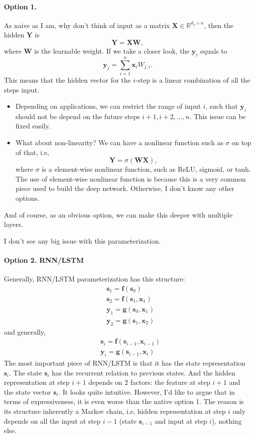 \documentclass[11pt,a4paper]{article}
\begin{document}
\paragraph{Option 1.} 
As naive as I am, why don't think of input as a matrix $\bm{X} \in \mathbb{R}^{d_1 \times n}$, then the hidden $\bm{Y}$ is
\[
\bm{Y} = \bm{X} \bm{W},
\] 
where $\bm{W}$ is the learnable weight. If we take a closer look, the $\bm{y}_i$ equals to
\[
\bm{y}_j = \sum^{n}_{i=1} \bm{x}_i W_{j, i}.
\] 
This means that the hidden vector for the $i$-step is a linear combination of all the steps input.
\begin{itemize}
    \item Depending on applications, we can restrict the range of input $i$, such that $\bm{y}_i$ should not be depend on the future steps $i+1, i+2, \ldots , n$. This issue can be fixed easily.
    \item What about non-linearity? We can have a nonlinear function such as $\sigma$ on top of that, i.e, 
        \[
        \bm{Y} = \sigma(\bm{W}\bm{X}),
        \] 
        where $\sigma$ is a element-wise nonlinear function, such as ReLU, sigmoid, or tanh. The use of element-wise nonlinear function is because this is a very common piece used to build the deep network. Otherwise, I don't know any other options.
\end{itemize}
And of course, as an obvious option, we can make this deeper with multiple layers.

I don't see any big issue with this parameterization.

\paragraph{Option 2. RNN/LSTM} 
Generally, RNN/LSTM parameterization has this structure:
\begin{align*}
&\bm{s}_1 = \bm{f}(\bm{s}_0) \\
&\bm{s}_2 = \bm{f}(\bm{s}_1, \bm{x}_1) \\
&\bm{y}_1 = \bm{g}(\bm{s}_0, \bm{x}_1) \\
&\bm{y}_2 = \bm{g}(\bm{s}_1, \bm{x}_2)
\end{align*}
and generally,
\begin{align*}
    &\bm{s}_i = \bm{f}(\bm{s}_{i-1}, \bm{x}_{i-1}) \\
    &\bm{y}_i = \bm{g}(\bm{s}_{i-1}, \bm{x}_i) 
\end{align*}
The most important piece of RNN/LSTM is that it has the state representation $\bm{s}_i$. The state $\bm{s}_i$ has the recurrent relation to previous states. And the hidden representation at step $i+1$ depends on 2 factors: the feature at step $i+1$ and the state vector $\bm{s}_i$.
It looks quite intuitive.
However, I'd like to argue that in terms of expressiveness, it is even worse than the native option 1.
The reason is its structure inherently a Markov chain, i.e, hidden representation at step $i$ only depends on all the input at step $i-1$ (state $\bm{s}_{i-1}$ and input at step $i$), nothing else.
\end{document}
